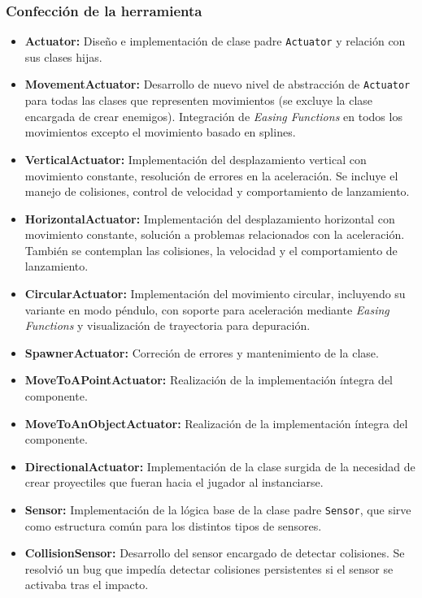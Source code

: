 \subsubsection*{Confección de la herramienta}
\begin{itemize}
	\item \textbf{Actuator:} Diseño e implementación de clase padre \texttt{Actuator} y relación con sus clases hijas.
	\item \textbf{MovementActuator:} Desarrollo de nuevo nivel de abstracción de \texttt{Actuator} para todas las clases que representen movimientos (se excluye la clase encargada de crear enemigos). Integración de \textit{Easing Functions} en todos los movimientos excepto el movimiento basado en splines.
	\item \textbf{VerticalActuator:} Implementación del desplazamiento vertical con movimiento constante, resolución de errores en la aceleración. Se incluye el manejo de colisiones, control de velocidad y comportamiento de lanzamiento.
	\item \textbf{HorizontalActuator:} Implementación del desplazamiento horizontal con movimiento constante, solución a problemas relacionados con la aceleración. También se contemplan las colisiones, la velocidad y el comportamiento de lanzamiento.
	\item \textbf{CircularActuator:} Implementación del movimiento circular, incluyendo su variante en modo péndulo, con soporte para aceleración mediante \textit{Easing Functions} y visualización de trayectoria para depuración.
  	\item \textbf{SpawnerActuator:} Correción de errores y mantenimiento de la clase.
 	\item \textbf{MoveToAPointActuator:} Realización de la implementación íntegra del componente.
	\item \textbf{MoveToAnObjectActuator:} Realización de la implementación íntegra del componente.
	\item \textbf{DirectionalActuator:} Implementación de la clase surgida de la necesidad de crear proyectiles que fueran hacia el jugador al instanciarse.
	\item \textbf{Sensor:} Implementación de la lógica base de la clase padre \texttt{Sensor}, que sirve como estructura común para los distintos tipos de sensores.
  	\item \textbf{CollisionSensor:} Desarrollo del sensor encargado de detectar colisiones. Se resolvió un bug que impedía detectar colisiones persistentes si el sensor se activaba tras el impacto.

\end{itemize}
